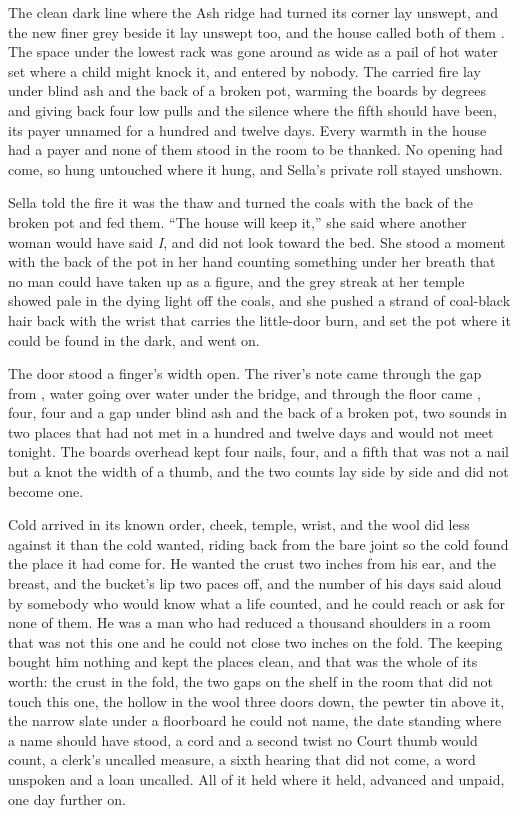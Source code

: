 The clean dark line where the Ash ridge had turned its corner lay unswept, and the new finer grey beside it lay unswept too, and the house called both of them . The space under the lowest rack was gone around as wide as a pail of hot water set where a child might knock it, and entered by nobody. The carried fire lay under blind ash and the back of a broken pot, warming the boards by degrees and giving back four low pulls and the silence where the fifth should have been, its payer unnamed for a hundred and twelve days. Every warmth in the house had a payer and none of them stood in the room to be thanked. No opening had come, so  hung untouched where it hung, and Sella's private roll stayed unshown.

Sella told the fire it was the thaw and turned the coals with the back of the broken pot and fed them. “The house will keep it,” she said where another woman would have said \emph{I}, and did not look toward the bed. She stood a moment with the back of the pot in her hand counting something under her breath that no man could have taken up as a figure, and the grey streak at her temple showed pale in the dying light off the coals, and she pushed a strand of coal-black hair back with the wrist that carries the little-door burn, and set the pot where it could be found in the dark, and went on.

The door stood a finger's width open. The river's note came through the gap from , water going over water under the bridge, and through the floor came , four, four and a gap under blind ash and the back of a broken pot, two sounds in two places that had not met in a hundred and twelve days and would not meet tonight. The boards overhead kept four nails, four, and a fifth that was not a nail but a knot the width of a thumb, and the two counts lay side by side and did not become one.

Cold arrived in its known order, cheek, temple, wrist, and the wool did less against it than the cold wanted, riding back from the bare joint so the cold found the place it had come for. He wanted the crust two inches from his ear, and the breast, and the bucket's lip two paces off, and the number of his days said aloud by somebody who would know what a life counted, and he could reach or ask for none of them. He was a man who had reduced a thousand shoulders in a room that was not this one and he could not close two inches on the fold. The keeping bought him nothing and kept the places clean, and that was the whole of its worth: the crust in the fold, the two gaps on the shelf in the room that did not touch this one, the hollow in the wool three doors down, the pewter tin above it, the narrow slate under a floorboard he could not name, the date standing where a name should have stood, a cord and a second twist no Court thumb would count, a clerk's uncalled measure, a sixth hearing that did not come, a word unspoken and a loan uncalled. All of it held where it held, advanced and unpaid, one day further on.

